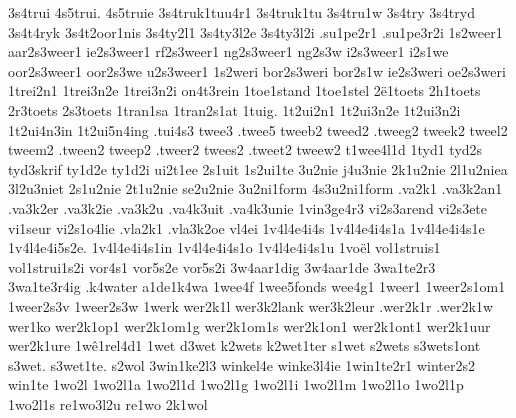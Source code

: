 {%
3s4trui
4s5trui.
4s5truie
3s4truk1tuu4r1
3s4truk1tu
3s4tru1w
3s4try
3s4tryd
3s4t4ryk
3s4t2oor1nis
3s4ty2l1
3s4ty3l2e
3s4ty3l2i
%
.su1pe2r1
.su1pe3r2i
%
1s2weer1
aar2s3weer1
ie2s3weer1
rf2s3weer1
ng2s3weer1
ng2s3w
i2s3weer1
i2s1we
oor2s3weer1
oor2s3we
u2s3weer1
1s2weri
bor2s3weri
bor2s1w
ie2s3weri
oe2s3weri
%
1trei2n1
1trei3n2e
1trei3n2i
on4t3rein
%
1toe1stand
%
1toe1stel
%
2ë1toets
2h1toets
2r3toets
2s3toets
%
1tran1sa
1tran2s1at
%
1tuig.
%
1t2ui2n1
1t2ui3n2e
1t2ui3n2i
1t2ui4n3in
1t2ui5n4ing
%
.tui4s3
%
twee3
.twee5
tweeb2
tweed2
.tweeg2
tweek2
tweel2
tweem2
.tween2
tweep2
.tweer2
twees2
.tweet2
tweew2
%
t1wee4l1d
%
1tyd1
tyd2s
tyd3skrif
ty1d2e
ty1d2i
%
ui2t1ee
2s1uit
1s2ui1te
%
3u2nie
j4u3nie
2k1u2nie
2l1u2niea
3l2u3niet
2s1u2nie
2t1u2nie
se2u2nie
%
3u2ni1form
4s3u2ni1form
%
.va2k1
.va3k2an1
.va3k2er
.va3k2ie
.va3k2u
.va4k3uit
.va4k3unie
%
1vin3ge4r3
%
vi2s3arend
vi2s3ete
vi1seur
vi2s1o4lie
%
.vla2k1
.vla3k2oe
%
vl4ei
%
1v4l4e4i4s
1v4l4e4i4s1a
1v4l4e4i4s1e
1v4l4e4i5s2e.
1v4l4e4i4s1in
1v4l4e4i4s1o
1v4l4e4i4s1u
%
1voël
%
vol1struis1
vol1strui1s2i
%
vor4s1
vor5s2e
vor5s2i
%
3w4aar1dig
3w4aar1de
%
3wa1te2r3
3wa1te3r4ig
.k4water
a1de1k4wa
%
1wee4f
1wee5fonds
%
wee4g1
%
1weer1
1weer2s1om1
1weer2s3v
1weer2s3w
%
1werk
wer2k1l
wer3k2lank
wer3k2leur
.wer2k1r
.wer2k1w
wer1ko
wer2k1op1
wer2k1om1g
wer2k1om1s
wer2k1on1
wer2k1ont1
wer2k1uur
wer2k1ure
%
1wê1rel4d1
%
1wet
d3wet
k2wets
k2wet1ter
s1wet
s2wets
s3wets1ont
s3wet.
s3wet1te.
s2wol
%
3win1ke2l3
winkel4e
winke3l4ie
%
1win1te2r1
winter2s2
win1te
%
1wo2l
1wo2l1a
1wo2l1d
1wo2l1g
1wo2l1i
1wo2l1m
1wo2l1o
1wo2l1p
1wo2l1s
re1wo3l2u
re1wo
2k1wol
%
}
